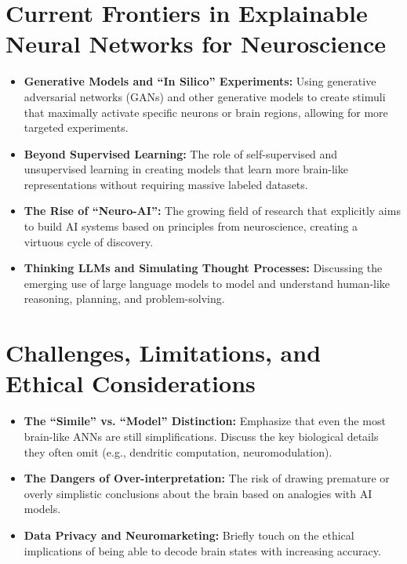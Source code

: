 \documentclass[11pt,a4paper]{article}
\begin{document}
\section{Current Frontiers in Explainable Neural Networks for Neuroscience}
\begin{itemize}
    \item \textbf{Generative Models and ``In Silico'' Experiments:} Using generative adversarial networks (GANs) and other generative models to create stimuli that maximally activate specific neurons or brain regions, allowing for more targeted experiments.
    \item \textbf{Beyond Supervised Learning:} The role of self-supervised and unsupervised learning in creating models that learn more brain-like representations without requiring massive labeled datasets.
    \item \textbf{The Rise of ``Neuro-AI'':} The growing field of research that explicitly aims to build AI systems based on principles from neuroscience, creating a virtuous cycle of discovery.
    \item \textbf{Thinking LLMs and Simulating Thought Processes:} Discussing the emerging use of large language models to model and understand human-like reasoning, planning, and problem-solving.
\end{itemize}

\section{Challenges, Limitations, and Ethical Considerations}
\begin{itemize}
    \item \textbf{The ``Simile'' vs. ``Model'' Distinction:} Emphasize that even the most brain-like ANNs are still simplifications. Discuss the key biological details they often omit (e.g., dendritic computation, neuromodulation).
    \item \textbf{The Dangers of Over-interpretation:} The risk of drawing premature or overly simplistic conclusions about the brain based on analogies with AI models.
    \item \textbf{Data Privacy and Neuromarketing:} Briefly touch on the ethical implications of being able to decode brain states with increasing accuracy.
\end{itemize}
\end{document}
